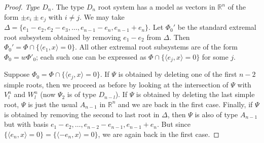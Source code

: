 \documentclass[12pt]{amsart}
\theoremstyle{remark}
\begin{document}
\begin{proof}

\medskip

\noindent \textit{Type $D_n$.} The type $D_n$ root system has a model as vectors in $\mathbb{R}^n$ of the form $\pm e_i \pm e_j$ with $i \neq j$. We may take $\Delta = \{e_1 - e_2, e_2 - e_3, \dots, e_{n-1} - e_n, e_{n-1} + e_n \}$. Let $\Phi_0'$ be the standard extremal root subsystem obtained by removing $e_1 - e_2$ from $\Delta$. Then $\Phi_0' = \Phi \cap \{\langle e_1, x \rangle = 0\}$. All other extremal root subsystems are of the form $\Phi_0=w \Phi'_0$; each such one can be expressed as $\Phi\cap \{\langle e_j, x \rangle = 0\}$ for some $j$.

 Suppose $\Phi_0= \Phi\cap \{\langle e_j, x \rangle = 0\}$. If $\Psi$ is obtained by deleting one of the first $n-2$ simple roots, then we proceed as before by looking at the intersection of $\Psi$ with $V_l^n$ and $W_l^n$ (now $\Psi_2$ is of type $D_{n-l}$). If $\Psi$ is obtained by deleting the last simple root, $\Psi$ is just the usual $A_{n-1}$ in $\mathbb{R}^n$ and we are back in the first case. Finally, if $\Psi$ is obtained by removing the second to last root in $\Delta$, then $\Psi$ is also of type $A_{n-1}$ but with basis $e_1-e_2,\ldots, e_{n-2}-e_{n-1}, e_{n-1}+e_n$. But since $\{ \langle e_n, x \rangle = 0 \}= \{ \langle -e_n, x \rangle = 0 \}$, we are again back in the first case.
    
    

\end{proof}
\end{document}
